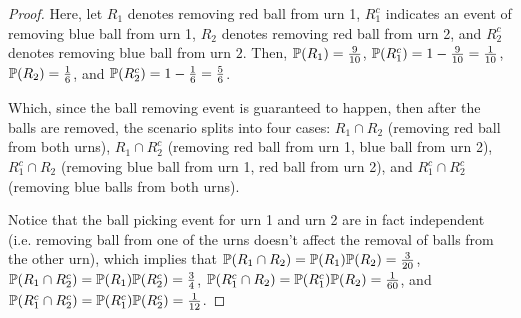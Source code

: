 \documentclass{article}
\begin{document}
\begin{proof}
    Here, let $R_1$ denotes removing red ball from urn 1, $R_1^c$ indicates an event of removing blue ball from urn 1, $R_2$ denotes removing red ball from urn 2, and $R_2^c$ denotes removing blue ball from urn $2$. Then, $\mathbb{P}(R_1)=\frac{9}{10}$, $\mathbb{P}(R_1^c)=1-\frac{9}{10}=\frac{1}{10}$, $\mathbb{P}(R_2)=\frac{1}{6}$, and $\mathbb{P}(R_2^c)=1-\frac{1}{6}=\frac{5}{6}$.

    Which, since the ball removing event is guaranteed to happen, then after the balls are removed, the scenario splits into four cases: $R_1\cap R_2$ (removing red ball from both urns), $R_1\cap R_2^c$ (removing red ball from urn 1, blue ball from urn 2), $R_1^c\cap R_2$ (removing blue ball from urn 1, red ball from urn 2), and $R_1^c\cap R_2^c$ (removing blue balls from both urns).

    Notice that the ball picking event for urn 1 and urn 2 are in fact independent (i.e. removing ball from one of the urns doesn't affect the removal of balls from the other urn), which implies that $\mathbb{P}(R_1\cap R_2)=\mathbb{P}(R_1)\mathbb{P}(R_2)=\frac{3}{20}$, $\mathbb{P}(R_1\cap R_2^c)=\mathbb{P}(R_1)\mathbb{P}(R_2^c)=\frac{3}{4}$, $\mathbb{P}(R_1^c\cap R_2)=\mathbb{P}(R_1^c)\mathbb{P}(R_2)=\frac{1}{60}$, and $\mathbb{P}(R_1^c\cap R_2^c)=\mathbb{P}(R_1^c)\mathbb{P}(R_2^c)=\frac{1}{12}$.

    \hfil


\end{proof}
\end{document}
